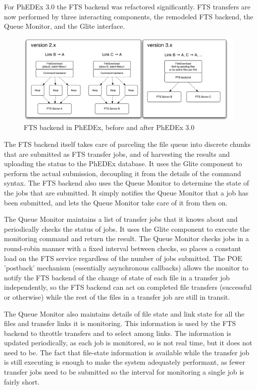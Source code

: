\documentclass{PoS}
\begin{document}
For PhEDEx 3.0 the FTS backend was refactored significantly. FTS
transfers are now performed by three interacting components, the
remodeled FTS backend, the Queue Monitor, and the Glite interface.

\begin{figure}[htp] 
\centering
\includegraphics[width=.8\textwidth]{fts-combined.pdf}
\caption{FTS backend in PhEDEx, before and after PhEDEx 3.0}
\label{fig:fts}
\end{figure} 

The FTS backend itself takes care of parceling the file queue into
discrete chunks that are submitted as FTS transfer jobs, and of
harvesting the results and uploading the status to the PhEDEx
database. It uses the Glite component to perform the actual
submission, decoupling it from the details of the command syntax. The
FTS backend also uses the Queue Monitor to determine the state of the
jobs that are submitted. It simply notifies the Queue Monitor that a
job has been submitted, and lets the Queue Monitor take care of it
from then on.

The Queue Monitor maintains a list of transfer jobs that it knows
about and periodically checks the status of jobs. It uses the Glite
component to execute the monitoring command and return the result. The
Queue Monitor checks jobs in a round-robin manner with a fixed
interval between checks, so places a constant load on the FTS service
regardless of the number of jobs submitted. The POE 'postback'
mechanism (essentially asynchronous callbacks) allows the monitor to
notify the FTS backend of the change of state of each file in a
transfer job independently, so the FTS backend can act on completed
file transfers (successful or otherwise) while the rest of the files
in a transfer job are still in transit.

The Queue Monitor also maintains details of file state and link state
for all the files and transfer links it is monitoring. This
information is used by the FTS backend to throttle transfers and to
select among links. The information is updated periodically, as each
job is monitored, so is not real time, but it does not need to be. The
fact that file-state information is available while the transfer job
is still executing is enough to make the system adequately performant,
as fewer transfer jobs need to be submitted so the interval for
monitoring a single job is fairly short.
\end{document}
